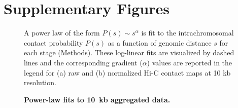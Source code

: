 
\section*{Supplementary Figures}

\begin{figure}[ht!]
  \begin{center}
  \hspace{0.03\textwidth}
  \end{center}
\caption{{\bf Power-law fits to 10~kb aggregated data.}}
{ A power law of the form $P(s) \sim s^\alpha$ is fit to the intrachromosomal
    contact probability $P(s)$ as a function of genomic distance $s$ for each
    stage (Methods). These log-linear fits are visualized by dashed lines and
    the corresponding gradient ($\alpha$) values are reported in the legend
    for (a) raw and (b) normalized Hi-C contact maps at 10 kb
    resolution.
}
\label{suppfig:power-law}
\end{figure}
\clearpage


